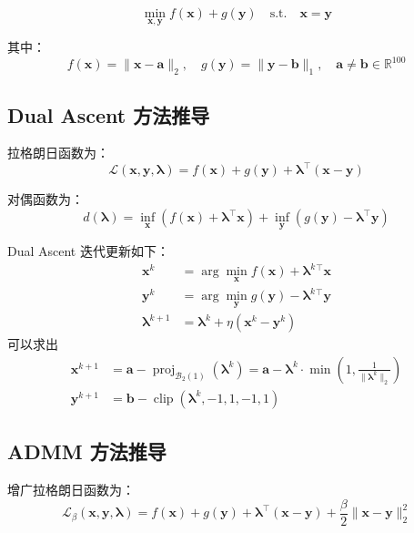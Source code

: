 \documentclass{homework}
\begin{document}
\begin{sol}

    \[
    \min_{\mathbf{x}, \mathbf{y}} f(\mathbf{x}) + g(\mathbf{y}) \quad \text{s.t.} \quad \mathbf{x} = \mathbf{y}
    \]
    
    其中：
    \[
    f(\mathbf{x}) = \|\mathbf{x} - \mathbf{a}\|_2, \quad g(\mathbf{y}) = \|\mathbf{y} - \mathbf{b}\|_1, \quad \mathbf{a} \neq \mathbf{b} \in \mathbb{R}^{100}
    \]
    
    \subsection*{Dual Ascent 方法推导}
    
    拉格朗日函数为：
    \[
    \mathcal{L}(\mathbf{x}, \mathbf{y}, \boldsymbol{\lambda}) = f(\mathbf{x}) + g(\mathbf{y}) + \boldsymbol{\lambda}^\top (\mathbf{x} - \mathbf{y})
    \]
    
    对偶函数为：
    \[
    d(\boldsymbol{\lambda}) = \inf_{\mathbf{x}} \left( f(\mathbf{x}) + \boldsymbol{\lambda}^\top \mathbf{x} \right) + \inf_{\mathbf{y}} \left( g(\mathbf{y}) - \boldsymbol{\lambda}^\top \mathbf{y} \right)
    \]
    
    Dual Ascent 迭代更新如下：
    \[
    \begin{aligned}
    \mathbf{x}^{k} &= \arg\min_{\mathbf{x}} f(\mathbf{x}) + \boldsymbol{\lambda}^k{}^\top \mathbf{x} \\
    \mathbf{y}^{k} &= \arg\min_{\mathbf{y}} g(\mathbf{y}) - \boldsymbol{\lambda}^k{}^\top \mathbf{y} \\
    \boldsymbol{\lambda}^{k+1} &= \boldsymbol{\lambda}^k + \eta (\mathbf{x}^k - \mathbf{y}^k)
    \end{aligned}
    \]
    可以求出
    \[
\begin{aligned}
    \mathbf{x}^{k+1} &= \mathbf{a} - \operatorname{proj}_{\mathcal{B}_2(1)}(\boldsymbol{\lambda}^k)
= \mathbf{a} - \boldsymbol{\lambda}^k \cdot \min\left(1, \frac{1}{\|\boldsymbol{\lambda}^k\|_2}\right)\\
\mathbf{y}^{k+1} &= \mathbf{b} - \operatorname{clip}(\boldsymbol{\lambda}^k, -1, 1, -1, 1)
\end{aligned}
\]
    \subsection*{ADMM 方法推导}
    
    增广拉格朗日函数为：
    \[
    \mathcal{L}_{\beta}(\mathbf{x}, \mathbf{y}, \boldsymbol{\lambda}) = f(\mathbf{x}) + g(\mathbf{y}) + \boldsymbol{\lambda}^\top (\mathbf{x} - \mathbf{y}) + \frac{\beta}{2} \|\mathbf{x} - \mathbf{y}\|_2^2
    \]
    

\end{sol}
\end{document}
